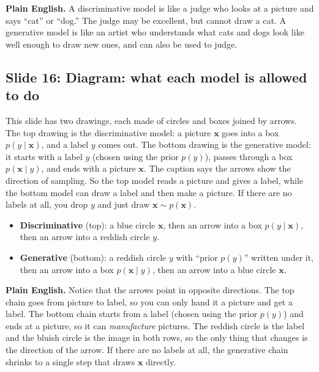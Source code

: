 \textbf{Plain English.} A discriminative model is like a judge who looks at a picture and says ``cat'' or ``dog.'' The judge may be excellent, but cannot draw a cat. A generative model is like an artist who understands what cats and dogs look like well enough to draw new ones, and can also be used to judge.

\subsection*{Slide 16: Diagram: what each model is allowed to do}

This slide has two drawings, each made of circles and boxes joined by arrows. The top drawing is the discriminative model: a picture $\mathbf{x}$ goes into a box $p(y\mid\mathbf{x})$, and a label $y$ comes out. The bottom drawing is the generative model: it starts with a label $y$ (chosen using the prior $p(y)$), passes through a box $p(\mathbf{x}\mid y)$, and ends with a picture $\mathbf{x}$. The caption says the arrows show the direction of sampling. So the top model reads a picture and gives a label, while the bottom model can draw a label and then make a picture. If there are no labels at all, you drop $y$ and just draw $\mathbf{x}\sim p(\mathbf{x})$.
\begin{itemize}
\item \textbf{Discriminative} (top): a blue circle $\mathbf{x}$, then an arrow into a box $p(y\mid\mathbf{x})$, then an arrow into a reddish circle $y$.
\item \textbf{Generative} (bottom): a reddish circle $y$ with ``prior $p(y)$'' written under it, then an arrow into a box $p(\mathbf{x}\mid y)$, then an arrow into a blue circle $\mathbf{x}$.
\end{itemize}

\textbf{Plain English.} Notice that the arrows point in opposite directions. The top chain goes from picture to label, so you can only hand it a picture and get a label. The bottom chain starts from a label (chosen using the prior $p(y)$) and ends at a picture, so it can \textit{manufacture} pictures. The reddish circle is the label and the bluish circle is the image in both rows, so the only thing that changes is the direction of the arrow. If there are no labels at all, the generative chain shrinks to a single step that draws $\mathbf{x}$ directly.

